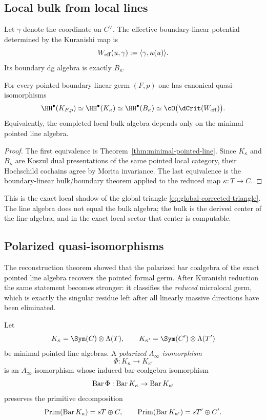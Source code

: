 \subsection{Local bulk from local lines}

Let $\gamma$ denote the coordinate on $C^\vee$. The effective boundary-linear potential determined by the Kuranishi map is
\[
W_{\mathrm{eff}}(u,\gamma):=\langle \gamma,\kappa(u)\rangle.
\]
Its boundary dg algebra is exactly $B_\kappa$.

\begin{theorem}\label{thm:local-bulk-line}
For every pointed boundary-linear germ $(F,p)$ one has canonical quasi-isomorphisms
\[
\HH^\bullet(K_{F,p})
\simeq
\HH^\bullet(K_\kappa)
\simeq
\HH^\bullet(B_\kappa)
\simeq
\cO\bigl(\dCrit(W_{\eff})\bigr).
\]
Equivalently, the completed local bulk algebra depends only on the minimal pointed line algebra.
\end{theorem}

\begin{proof}
The first equivalence is Theorem~\ref{thm:minimal-pointed-line}. Since $K_\kappa$ and $B_\kappa$ are Koszul dual presentations of the same pointed local category, their Hochschild cochains agree by Morita invariance. The last equivalence is the boundary-linear bulk/boundary theorem applied to the reduced map $\kappa:T\to C$.
\end{proof}

\begin{remark}
This is the exact local shadow of the global triangle \eqref{eq:global-corrected-triangle}. The line algebra does not equal the bulk algebra; the bulk is the derived center of the line algebra, and in the exact local sector that center is computable.
\end{remark}

\subsection{Polarized quasi-isomorphisms}

The reconstruction theorem showed that the polarized bar coalgebra of the exact pointed line algebra recovers the pointed formal germ. After Kuranishi reduction the same statement becomes stronger: it classifies the \emph{reduced} microlocal germ, which is exactly the singular residue left after all linearly massive directions have been eliminated.

\begin{definition}
Let
\[
K_\kappa=\Sym(C)\ot \Lambda(T),
\qquad
K_{\kappa'}=\Sym(C')\ot \Lambda(T')
\]
be minimal pointed line algebras. A \emph{polarized $A_\infty$ isomorphism}
\[
\Phi:K_\kappa\longrightarrow K_{\kappa'}
\]
is an $A_\infty$ isomorphism whose induced bar-coalgebra isomorphism
\[
\operatorname{Bar} \Phi:\operatorname{Bar} K_\kappa\to \operatorname{Bar} K_{\kappa'}
\]
preserves the primitive decomposition
\[
\mathrm{Prim}(\operatorname{Bar} K_\kappa)=sT\oplus C,
\qquad
\mathrm{Prim}(\operatorname{Bar} K_{\kappa'})=sT'\oplus C'.
\]
\end{definition}

